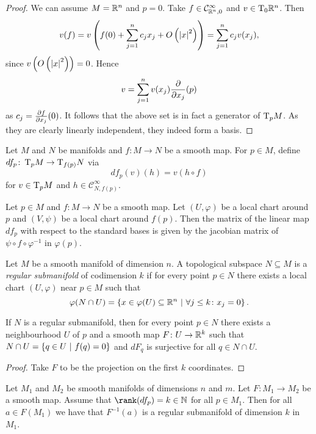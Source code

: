 \begin{proof}
We can assume $M=\mathbb{R}^n$ and $p=0$. Take
$f \in \mathcal{C}_{\mathbb{R}^n,0}^\infty$ and $v \in \operatorname{T}_0 \! \mathbb{R}^n$.
Then
\[
v(f) =
v \left(f(0) + \sum_{j=1}^n c_j x_j + O \left(\left\lvert x\right\rvert^2\right)\right) =
\sum_{j=1}^n c_j v(x_j),
\]
since $v \left(O \left(\left\lvert x\right\rvert^2\right)\right) = 0$. Hence
\[
v = \sum_{j=1}^n v(x_j) \frac{\partial }{\partial x_j}(p)
\]
as $c_j = \frac{\partial f}{\partial x_j}(0)$. It follows that the above set is in
fact a generator of $\operatorname{T}_p \! M$. As they are clearly linearly
independent, they indeed form a basis.
\end{proof}

\begin{definicija}
Let $M$ and $N$ be manifolds and $f \colon M \to N$ be a smooth
map. For $p \in M$, define
$d f_p \colon \operatorname{T}_p \! M \to \operatorname{T}_{f(p)} \! N$ via
\[
d f_p (v)(h) = v(h \circ f)
\]
for $v \in \operatorname{T}_p \! M$ and $h \in \mathcal{C}_{N,f(p)}^\infty$.
\end{definicija}

\begin{trditev}
Let $p \in M$ and $f \colon M \to N$ be a smooth map. Let
$(U, \varphi)$ be a local chart around $p$ and $(V, \psi)$ be a
local chart around $f(p)$. Then the matrix of the linear map
$d f_p$ with respect to the standard bases is given by the jacobian
matrix of $\psi \circ f \circ \varphi^{-1}$ in $\varphi(p)$.
\end{trditev}

\begin{definicija}
Let $M$ be a smooth manifold of dimension $n$. A topological
subspace $N \subseteq M$ is a
\emph{regular submanifold} of
codimension $k$ if for every point $p \in N$ there exists a local
chart $(U, \varphi)$ near $p \in M$ such that
\[
\varphi(N \cap U) =
\left\{x \in \varphi(U) \subseteq \mathbb{R}^n~\middle\vert~\forall j \leq k \colon x_j = 0\right\}.
\]
\end{definicija}

\begin{trditev}
If $N$ is a regular submanifold, then for every point $p \in N$
there exists a neighbourhood $U$ of $p$ and a smooth map
$F \colon U \to \mathbb{R}^k$ such that
$N \cap U = \left\{q \in U~\middle\vert~f(q) = 0\right\}$ and $d F_q$ is surjective for
all $q \in N \cap U$.
\end{trditev}

\begin{proof}
Take $F$ to be the projection on the first $k$ coordinates.
\end{proof}

\begin{izrek}[Rank]
Let $M_1$ and $M_2$ be smooth manifolds of dimensions $n$ and $m$.
Let $F \colon M_1 \to M_2$ be a smooth map. Assume that
$\rank(d f_p) = k \in \N$ for all $p \in M_1$. Then for all
$a \in F(M_1)$ we have that $F^{-1}(a)$ is a regular submanifold
of dimension $k$ in $M_1$.
\end{izrek}

